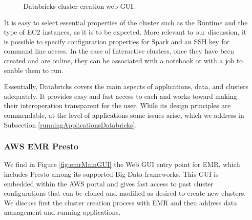 \begin{figure}
   \begin{center}
   \end{center}
   \caption{Databricks cluster creation web GUI.}
   \label{fig:databricksClusterCreationGUI}
\end{figure}

It is easy to select essential properties of the cluster such as the Runtime and the type of EC2 instances, as it is to be expected. More relevant to our discussion, it is possible to specify configuration properties for Spark and an SSH key for command line access. In the case of Interactive clusters, once they have been created and are online, they can be associated with a notebook or with a job to enable them to run.

Essentially, Databricks covers the main aspects of applications, data, and clusters adequately. It provides easy and fast access to each and works toward making their interoperation transparent for the user. While its design principles are commendable, at the level of applications some issues arise, which we address in Subsection \ref{runningApplicationsDatabricks}.

\subsubsection{AWS EMR Presto}
We find in Figure \ref{fig:emrMainGUI} the Web GUI entry point for EMR, which includes Presto among its supported Big Data frameworks. This GUI is embedded within the AWS portal and gives fast access to past cluster configurations that can be cloned and modified as desired to create new clusters. We discuss first the cluster creation process with EMR and then address data management and running applications.

